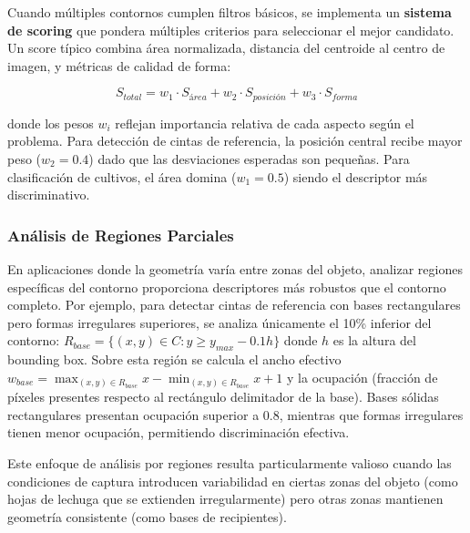 Cuando múltiples contornos cumplen filtros básicos, se implementa un \textbf{sistema de scoring} que pondera múltiples criterios para seleccionar el mejor candidato. Un score típico combina área normalizada, distancia del centroide al centro de imagen, y métricas de calidad de forma:

\begin{equation}
S_{total} = w_1 \cdot S_{área} + w_2 \cdot S_{posición} + w_3 \cdot S_{forma}
\end{equation}

donde los pesos $w_i$ reflejan importancia relativa de cada aspecto según el problema. Para detección de cintas de referencia, la posición central recibe mayor peso ($w_2 = 0.4$) dado que las desviaciones esperadas son pequeñas. Para clasificación de cultivos, el área domina ($w_1 = 0.5$) siendo el descriptor más discriminativo.

\subsubsection{Análisis de Regiones Parciales}

En aplicaciones donde la geometría varía entre zonas del objeto, analizar regiones específicas del contorno proporciona descriptores más robustos que el contorno completo. Por ejemplo, para detectar cintas de referencia con bases rectangulares pero formas irregulares superiores, se analiza únicamente el 10\% inferior del contorno: $R_{base} = \{(x,y) \in C : y \geq y_{max} - 0.1h\}$ donde $h$ es la altura del bounding box. Sobre esta región se calcula el ancho efectivo $w_{base} = \max_{(x,y) \in R_{base}} x - \min_{(x,y) \in R_{base}} x + 1$ y la ocupación (fracción de píxeles presentes respecto al rectángulo delimitador de la base). Bases sólidas rectangulares presentan ocupación superior a 0.8, mientras que formas irregulares tienen menor ocupación, permitiendo discriminación efectiva.

Este enfoque de análisis por regiones resulta particularmente valioso cuando las condiciones de captura introducen variabilidad en ciertas zonas del objeto (como hojas de lechuga que se extienden irregularmente) pero otras zonas mantienen geometría consistente (como bases de recipientes).
